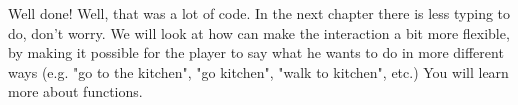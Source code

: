 Well done! Well, that was a lot of code. In the next chapter there is less typing to do, don't worry. We will look at how can make the interaction a bit more flexible, by making it possible for the player to say what he wants to do in more different ways (e.g. "go to the kitchen", "go kitchen", "walk to kitchen", etc.) You will learn more about functions.       





   